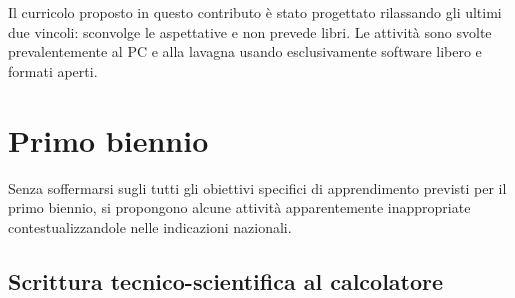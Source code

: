 \documentclass{easychair}
\begin{document}
Il curricolo proposto in questo contributo è stato progettato rilassando
gli ultimi due vincoli: sconvolge le aspettative e non prevede libri.
Le attività sono svolte prevalentemente al PC e alla lavagna usando 
esclusivamente software libero e formati aperti.

\section{Primo biennio}


Senza soffermarsi sugli tutti gli obiettivi specifici di apprendimento previsti
per il primo biennio, si propongono alcune attività apparentemente inappropriate
contestualizzandole nelle indicazioni nazionali.

\subsection[Scrittura tecnico-scientifica]{Scrittura tecnico-scientifica al calcolatore} 
\end{document}
